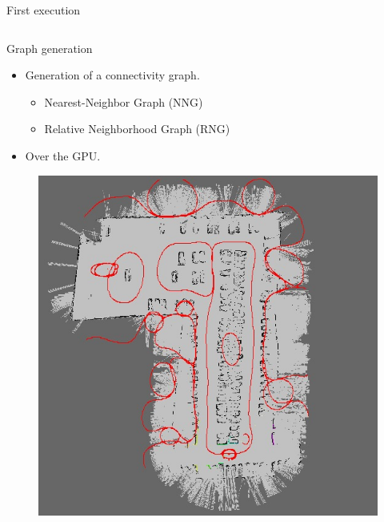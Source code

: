 \begin{frame}{First execution}
\begin{columns}
\begin{overlayarea}{\textwidth}{\textheight}
{\begin{block}{}
\begin{itemize}
	  \end{itemize}
	\end{block}
      }
      {
	\begin{block}{Graph generation}
	\footnotesize
	  \begin{itemize}
	    \item Generation of a connectivity graph.
	    \begin{itemize}
	     \item<5-> Nearest-Neighbor Graph (NNG)
	     \item<6-> Relative Neighborhood Graph (RNG)
	    \end{itemize}
	    \item<7-> Over the GPU.
	  \end{itemize}
	  
	   {
	    \vskip-0.5cm
	    \begin{figure}
	      \includegraphics[height=0.5\textheight]{figure3}
	    \end{figure}
	  }
	   {
	    \vskip-0.5cm
	    \begin{figure}

\end{figure}}
\end{block}}
\end{overlayarea}
\end{columns}
\end{frame}
